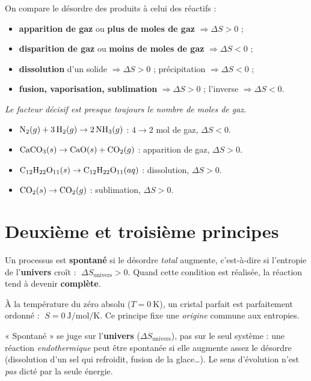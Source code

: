 \documentclass[11pt,a4paper]{article}
\newcommand{\dS}{\Delta S}
\begin{document}
\begin{methodeb}
On compare le désordre des produits à celui des réactifs :
\begin{itemize}[leftmargin=1.5em,topsep=1pt,itemsep=1pt]
  \item \textbf{apparition de gaz} ou \textbf{plus de moles de gaz} $\Rightarrow \dS>0$ ;
  \item \textbf{disparition de gaz} ou \textbf{moins de moles de gaz} $\Rightarrow \dS<0$ ;
  \item \textbf{dissolution} d'un solide $\Rightarrow \dS>0$ ; précipitation $\Rightarrow \dS<0$ ;
  \item \textbf{fusion, vaporisation, sublimation} $\Rightarrow \dS>0$ ; l'inverse $\Rightarrow \dS<0$.
\end{itemize}
\emph{Le facteur décisif est presque toujours le nombre de moles de gaz.}
\end{methodeb}

\begin{exempleb}
\begin{itemize}[leftmargin=1.5em,topsep=1pt,itemsep=1pt]
  \item $\ce{N2}(g)+3\,\ce{H2}(g)\rightarrow2\,\ce{NH3}(g)$ : $4\to2$ mol de gaz, $\dS<0$.
  \item $\ce{CaCO3}(s)\rightarrow\ce{CaO}(s)+\ce{CO2}(g)$ : apparition de gaz, $\dS>0$.
  \item $\ce{C12H22O11}(s)\rightarrow\ce{C12H22O11}(aq)$ : dissolution, $\dS>0$.
  \item $\ce{CO2}(s)\rightarrow\ce{CO2}(g)$ : sublimation, $\dS>0$.
\end{itemize}
\end{exempleb}

\section{Deuxième et troisième principes}

\begin{principeb}
Un processus est \textbf{spontané} si le désordre \emph{total} augmente, c'est-à-dire si l'entropie de
l'\textbf{univers} croît : $\;\dS_{\text{univers}} > 0$. Quand cette condition est réalisée, la réaction
tend à devenir \textbf{complète}.
\end{principeb}

\begin{principeb}
À la température du zéro absolu ($T=\SI{0}{\kelvin}$), un cristal parfait est parfaitement ordonné :
$\;S=\SI{0}{\joule\per\mol\per\kelvin}$. Ce principe fixe une \emph{origine} commune aux entropies.
\end{principeb}

\begin{attentionb}
« Spontané » se juge sur l'\textbf{univers} ($\dS_{\text{univers}}$), pas sur le seul système : une
réaction \emph{endothermique} peut être spontanée si elle augmente assez le désordre (dissolution d'un
sel qui refroidit, fusion de la glace\ldots). Le sens d'évolution n'est \emph{pas} dicté par la seule énergie.
\end{attentionb}
\end{document}
